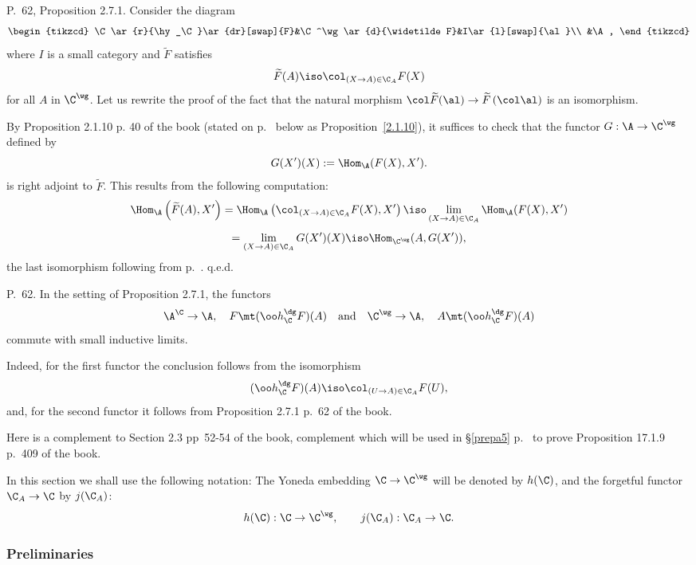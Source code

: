 \documentclass[12pt]{article}
\theoremstyle{remark}
\theoremstyle{definition}
\begin{document}
%

\begin{s}
P.~62, Proposition 2.7.1. Consider the diagram 
$$
\begin{tikzcd}
\C\ar{r}{\hy_\C}\ar{dr}[swap]{F}&\C^\wg\ar{d}{\widetilde F}&I\ar{l}[swap]{\al}\\
&\A,
\end{tikzcd}
$$
where $I$ is a small category and $\widetilde F$ satisfies 
$$
\widetilde F(A)\iso\col_{(X\to A)\in\C_A}F(X)
$$ 
for all $A$ in $\C^\wg$. Let us rewrite the proof of the fact that the natural morphism $\col\widetilde F(\al)\to\widetilde F\left(\col\al\right)$ is an isomorphism. 

By Proposition 2.1.10 p. 40 of the book (stated on p.~ below as Proposition~\ref{2.1.10}), it suffices to check that the functor $G:\A\to\C^\wg$ defined by 
$$
G(X')(X):=\Hom_{\A}(F(X),X').
$$ 
is right adjoint to $\widetilde F$. This results from the following computation: 
$$
\Hom_{\A}\left(\widetilde F(A),X'\right)=
\Hom_{\A}\left(\col_{(X\to A)\in\C_A}F(X),X'\right)\iso 
\lim_{(X\to A)\in\C_A}\Hom_{\A}(F(X),X')
$$
$$
=\lim_{(X\to A)\in\C_A}G(X')(X)\iso\Hom_{\C^\wg}(A,G(X')), 
$$ 
the last isomorphism following from  p.~. q.e.d.
\end{s}

%

\begin{s}
P.~62. In the setting of Proposition 2.7.1, the functors
$$
\A^\C\to\A,\quad F\mt(\oo h_\C^\dg F)(A)\quad\text{and}\quad
\C^\wg\to\A,\quad A\mt(\oo h_\C^\dg F)(A)
$$ 
commute with small inductive limits. 

Indeed, for the first functor the conclusion follows from the isomorphism 
$$
(\oo h_\C^\dg F)(A)\iso\col_{(U\to A)\in\C_A}F(U),
$$ 
and, for the second functor it follows from Proposition 2.7.1 p.~62 of the book.
\end{s} 



Here is a complement to Section 2.3 pp~52-54 of the book, complement which will be used in \S\ref{prepa5} p.~ to prove Proposition 17.1.9 p.~409 of the book. 

In this section we shall use the following notation: The Yoneda embedding $\C\to\C^\wg$ will be denoted by $h(\C)$, and the forgetful functor $\C_A\to\C$ by $j(\C_A)$: 
$$
h(\C):\C\to\C^\wg,\qquad j(\C_A):\C_A\to\C.
$$

\subsubsection{Preliminaries}
\end{document}
